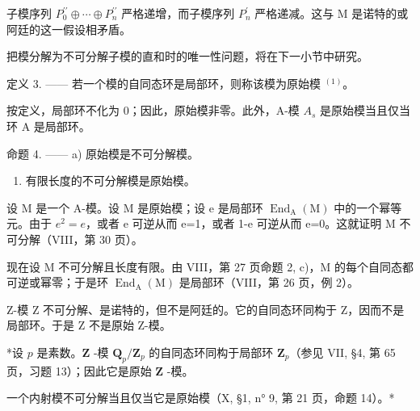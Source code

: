 子模序列 \(P_{0}^{\prime\prime} \oplus \cdots \oplus P_{n}^{\prime\prime}\) 严格递增，而子模序列 \(P_{n}^{\prime}\) 严格递减。这与 M 是诺特的或阿廷的这一假设相矛盾。

把模分解为不可分解子模的直和时的唯一性问题，将在下一小节中研究。

定义 3. —— 若一个模的自同态环是局部环，则称该模为原始模 \(^{(1)}\)。

按定义，局部环不化为 0；因此，原始模非零。此外，A-模 \(A_{s}\) 是原始模当且仅当环 A 是局部环。

命题 4. —— a) 原始模是不可分解模。

\begin{enumerate}
\def\labelenumi{\alph{enumi})}
\setcounter{enumi}{1}
\tightlist
\item
  有限长度的不可分解模是原始模。
\end{enumerate}

设 M 是一个 A-模。设 M 是原始模；设 e 是局部环 \(\operatorname{End}_{\mathrm{A}}(\mathrm{M})\) 中的一个幂等元。由于 \(e^{2}=e\)，或者 e 可逆从而 e=1，或者 1-e 可逆从而 e=0。这就证明 M 不可分解（VIII，第 30 页）。

现在设 M 不可分解且长度有限。由 VIII，第 27 页命题 2, c)，M 的每个自同态都可逆或幂零；于是环 \(\operatorname{End}_{\mathrm{A}}(\mathrm{M})\) 是局部环（VIII，第 26 页，例 2）。

Z-模 Z 不可分解、是诺特的，但不是阿廷的。它的自同态环同构于 Z，因而不是局部环。于是 Z 不是原始 Z-模。

*设 \(p\) 是素数。\(\mathbf{Z}\) -模 \(\mathbf{Q}_p / \mathbf{Z}_p\) 的自同态环同构于局部环 \(\mathbf{Z}_p\)（参见 VII, §4, 第 65 页，习题 13）；因此它是原始 \(\mathbf{Z}\) -模。

一个内射模不可分解当且仅当它是原始模（X, §1, n° 9, 第 21 页，命题 14）。*

